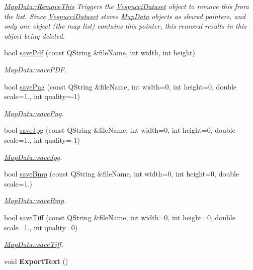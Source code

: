 \begin{DoxyCompactItemize}
\begin{DoxyCompactList}\small\item\em \hyperlink{class_map_data_aa98f0fec1e13eab7858dce7b7fe31561}{Map\+Data\+::\+Remove\+This} Triggers the \hyperlink{class_vespucci_dataset}{Vespucci\+Dataset} object to remove this from the list. Since \hyperlink{class_vespucci_dataset}{Vespucci\+Dataset} stores \hyperlink{class_map_data}{Map\+Data} objects as shared pointers, and only one object (the map list) contains this pointer, this removal results in this object being deleted. \end{DoxyCompactList}\item 
bool \hyperlink{class_map_data_aecfef074535f5fa0586a94125782411a}{save\+Pdf} (const Q\+String \&file\+Name, int width, int height)
\begin{DoxyCompactList}\small\item\em Map\+Data\+::save\+P\+D\+F. \end{DoxyCompactList}\item 
bool \hyperlink{class_map_data_a6bcf8d8f2d6e06079565517934bd24e5}{save\+Png} (const Q\+String \&file\+Name, int width=0, int height=0, double scale=1., int quality=-\/1)
\begin{DoxyCompactList}\small\item\em \hyperlink{class_map_data_a6bcf8d8f2d6e06079565517934bd24e5}{Map\+Data\+::save\+Png}. \end{DoxyCompactList}\item 
bool \hyperlink{class_map_data_a79f4f199f916d9dbd8368a27070ea3c4}{save\+Jpg} (const Q\+String \&file\+Name, int width=0, int height=0, double scale=1., int quality=-\/1)
\begin{DoxyCompactList}\small\item\em \hyperlink{class_map_data_a79f4f199f916d9dbd8368a27070ea3c4}{Map\+Data\+::save\+Jpg}. \end{DoxyCompactList}\item 
bool \hyperlink{class_map_data_ae913ad8de2631267f8eb7f56a8c7682b}{save\+Bmp} (const Q\+String \&file\+Name, int width=0, int height=0, double scale=1.)
\begin{DoxyCompactList}\small\item\em \hyperlink{class_map_data_ae913ad8de2631267f8eb7f56a8c7682b}{Map\+Data\+::save\+Bmp}. \end{DoxyCompactList}\item 
bool \hyperlink{class_map_data_a4c90d0715c7591975e439d54a4a88e6d}{save\+Tiff} (const Q\+String \&file\+Name, int width=0, int height=0, double scale=1., int quality=0)
\begin{DoxyCompactList}\small\item\em \hyperlink{class_map_data_a4c90d0715c7591975e439d54a4a88e6d}{Map\+Data\+::save\+Tiff}. \end{DoxyCompactList}\item 
\hypertarget{class_map_data_ad7ad56bbfe5c466c1d29df04567a34f3}{void {\bfseries Export\+Text} ()}\label{class_map_data_ad7ad56bbfe5c466c1d29df04567a34f3}


\end{DoxyCompactItemize}
